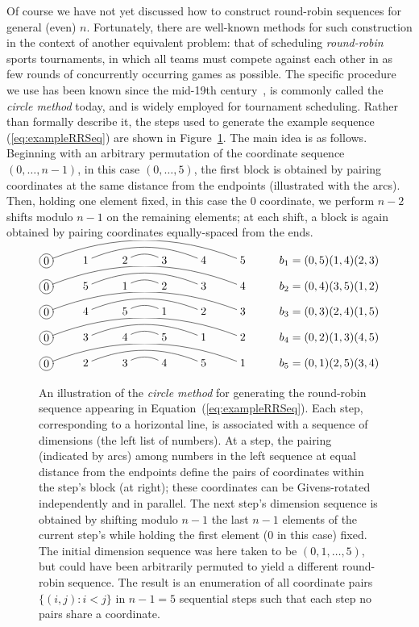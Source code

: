 \documentclass[superscriptaddress,floatfix]{article}
\begin{document}
Of course we have not yet discussed how to construct round-robin
sequences for general (even) $n$. Fortunately, there are well-known
methods for such construction in the context of another equivalent
problem: that of scheduling \emph{round-robin} sports tournaments, in
which all teams must compete against each other in as few rounds of
concurrently occurring games as possible. The specific procedure we
use has been known since the mid-19th
century~\cite{kirkman1847problem}, is commonly called the \emph{circle
  method} today, and is widely employed for tournament scheduling.
Rather than formally describe it, the steps used to generate the
example sequence (\ref{eq:exampleRRSeq}) are shown in
Figure~\ref{fig:circleAlgEx}. The main idea is as follows.  Beginning
with an arbitrary permutation of the coordinate sequence
$(0,\ldots,n-1)$, in this case $(0, \ldots, 5)$, the first block is
obtained by pairing coordinates at the same distance from the
endpoints (illustrated with the arcs). Then, holding one element
fixed, in this case the $0$ coordinate, we perform $n-2$ shifts modulo
$n-1$ on the remaining elements; at each shift, a block is again
obtained by pairing coordinates equally-spaced from the ends.
\begin{figure}
\[
\xymatrix{
 *+[Fo]{0}\ar@/{^1.5pc}/@{-}[rrrrr] &
 1 \ar@/{^1pc}/@{-}[rrr] &
 2 \ar@/{^0.5pc}/@{-}[r] &
 3 &
 4 &
 5 &
 b_1 =  (0,5) (1,4) (2,3)
}
\]
\vspace{0.25cm}
\[
\xymatrix{
 *+[Fo]{0}\ar@/{^1.5pc}/@{-}[rrrrr] &
 5 \ar@/{^1pc}/@{-}[rrr] &
 1 \ar@/{^0.5pc}/@{-}[r] &
 2 &
 3 &
 4 &
 b_2 = (0,4) (3,5) (1,2)
}
\]
\vspace{0.25cm}
\[
\xymatrix{
 *+[Fo]{0}\ar@/{^1.5pc}/@{-}[rrrrr] &
 4 \ar@/{^1pc}/@{-}[rrr] &
 5 \ar@/{^0.5pc}/@{-}[r] &
 1 &
 2 &
 3 &
 b_3 = (0,3) (2,4) (1,5)
}
\]
\vspace{0.25cm}
\[
\xymatrix{
 *+[Fo]{0}\ar@/{^1.5pc}/@{-}[rrrrr] &
 3 \ar@/{^1pc}/@{-}[rrr] &
 4 \ar@/{^0.5pc}/@{-}[r] &
 5 &
 1 &
 2 &
 b_4 = (0,2) (1,3) (4,5)
}
\]
\vspace{0.25cm}
\[
\xymatrix{
 *+[Fo]{0}\ar@/{^1.5pc}/@{-}[rrrrr] &
 2 \ar@/{^1pc}/@{-}[rrr] &
 3 \ar@/{^0.5pc}/@{-}[r] &
 4 &
 5 &
 1 &
 b_5 = (0,1) (2,5) (3,4)
}
\]
\caption{An illustration of the \emph{circle method} for generating
  the round-robin sequence appearing in
  Equation~(\ref{eq:exampleRRSeq}). Each step, corresponding to a horizontal
  line, is associated with a sequence of dimensions (the left list of
  numbers).  At a step, the pairing (indicated by arcs) among
  numbers in the left sequence at equal distance from the endpoints
  define the pairs of coordinates within the step's block (at right);
  these coordinates can be Givens-rotated independently and in
  parallel. The next step's dimension sequence is obtained by shifting
  modulo $n-1$ the last $n-1$ elements of the current step's while
  holding the first element (0 in this case) fixed. The initial
  dimension sequence was here taken to be $(0,1,\ldots,5)$, but could
  have been arbitrarily permuted to yield a different round-robin
  sequence. The result is an enumeration of all coordinate pairs $\{(i,j):i<j\}$
  in $n-1=5$ sequential steps such that each step no pairs share a
  coordinate.}
\label{fig:circleAlgEx}
\end{figure}
\end{document}
